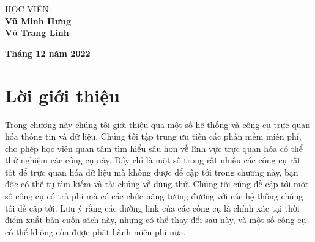 \documentclass[13pt]{scrartcl} %
\begin{document}
\begin{titlepage}
    \hspace{0cm}\begin{minipage}[t]{0.7\textwidth}
        \normalsize
        HỌC VIÊN: \\
        \-\hspace{1cm}\large\textbf{Vũ Minh Hưng} \\
        \-\hspace{1cm}\large\textbf{Vũ Trang Linh}
    \end{minipage}
    \par
    \vfill
    \begin{center}
        {\large{\bf Tháng 12 năm 2022 }}
    \end{center}
\end{titlepage}



\date{ }
\tableofcontents

\pagebreak

\section{Lời giới thiệu}
Trong chương này chúng tôi giới thiệu qua một số hệ thống và công cụ trực quan hóa thông tin và dữ liệu. Chúng tôi tập trung ưu tiên các phần mềm miễn phí, cho phép học viên quan tâm tìm hiểu sâu hơn về lĩnh vực trực quan hóa có thể thử nghiệm các công cụ này. Đây chỉ là một số trong rất nhiều các công cụ rất tốt để trực quan hóa dữ liệu mà không được để cập tới trong chương này, bạn độc có thể tự tìm kiếm và tải chúng về dùng thử. Chúng tôi cũng đề cập tới một số công cụ có trả phí mà có các chức năng tương đương với các hệ thống chúng tôi đề cập tới. Lưu ý rằng các đường link của các công cụ là chính xác tại thời điểm xuất bản cuốn sách này, nhưng có thể thay đổi sau này, và một số công cụ có thể không còn được phát hành miễn phí nữa.

\end{document}
